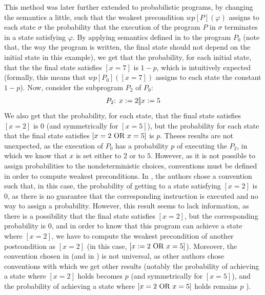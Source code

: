 \documentclass[a4paper,10pt]{llncs}
\begin{document}
This method was later further extended \cite{McIver05} to probabilistic programs, by changing the semantics a little, such that the weakest precondition $wp[P](\varphi)$ assigns to each state $\sigma$ the probability that the execution of the program $P$ in $\sigma$ terminates in a state satisfying $\varphi$. By applying semantics defined in \cite{McIver05} to the program $P_0$ (note that, the way the program is written, the final state should not depend on the initial state in this example), we get that the probability, for each initial state, that the the final state satisfies $[x = 7]$ is $1-p$, which is intuitively expected (formally, this means that $wp[P_0]([x = 7])$ assigns to each state the constant $1-p$). Now, consider the subprogram $P_2$ of $P_0$:
\begin{align*}
 P_2\textnormal{: } x := 2 [\!] x := 5 
\end{align*}
We also get that the probability, for each state, that the final state satisfies $[x = 2]$ is $0$ (and symmetrically for $[x = 5]$), but the probability for each state that the final state satisfies $[x = 2 \textnormal{ OR } x = 5]$ is $p$. Theses results are not unexpected, as the execution of $P_0$ has a probability $p$ of executing the $P_2$, in which we know that $x$ is set  either to $2$ or to $5$. However, as it is not possible to assign probabilities to the nondeterministic choices, conventions must be defined in order to compute weakest preconditions. In \cite{McIver05}, the authors chose a convention such that, in this case, the probability of getting to a state satisfying $[x = 2]$ is $0$, as there is no guarantee that the corresponding instruction is executed and no way to assign a probability.\newline
However, this result seems to lack information, as there is a possibility that the final state satisfies $[x = 2]$, but the corresponding probability is $0$, and in order to know that this program can achieve a state where $[x = 2]$, we have to compute the weakest precondition of another postcondition as $[x = 2]$ (in this case, $[x := 2 \textnormal{ OR } x = 5]$).\newline
Moreover, the convention chosen in \cite{McIver05} (and in \cite{WuChen11}) is not universal, as other authors \cite{WuChen08,WuChen12} chose conventions with which we get other results (notably the probability of achieving a state where $[x = 2]$ holds becomes $p$ (and symmetrically for $[x = 5]$), and the probability of achieving a state where $[x = 2 \textnormal{ OR } x = 5]$ holds remains $p$ ). \bigskip
\end{document}
